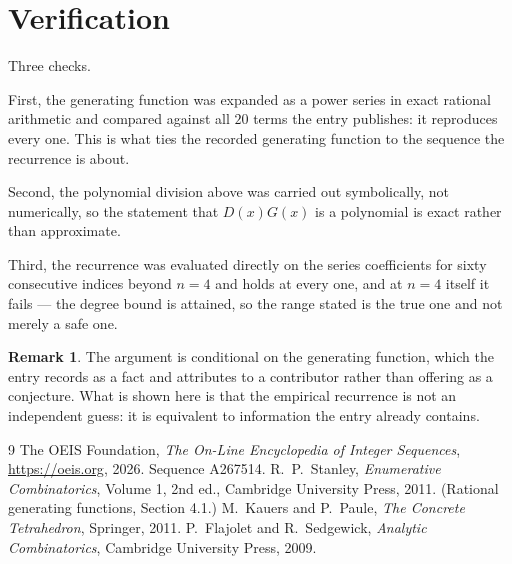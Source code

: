 \documentclass[11pt,a4paper]{article}
\theoremstyle{plain}
\theoremstyle{definition}
\newtheorem{remark}[theorem]{Remark}
\begin{document}
\section{Verification}

Three checks.

First, the generating function was expanded as a power series in exact rational arithmetic and
compared against all $20$ terms the entry publishes: it reproduces every one. This is
what ties the recorded generating function to the sequence the recurrence is about.

Second, the polynomial division above was carried out symbolically, not numerically, so the
statement that $D(x)G(x)$ is a polynomial is exact rather than approximate.

Third, the recurrence was evaluated directly on the series coefficients for sixty consecutive
indices beyond $n=4$ and holds at every one, and at $n=4$ itself it fails --- the
degree bound is attained, so the range stated is the true one and not merely a safe one.

\begin{remark}
The argument is conditional on the generating function, which the entry records as a fact and
attributes to a contributor rather than offering as a conjecture. What is shown here is that
the empirical recurrence is not an independent guess: it is equivalent to information the
entry already contains.
\end{remark}

\begin{thebibliography}{9}
 The OEIS Foundation, \emph{The On-Line Encyclopedia of Integer
Sequences}, \url{https://oeis.org}, 2026. Sequence A267514.
 R.~P.~Stanley, \emph{Enumerative Combinatorics}, Volume 1, 2nd ed.,
Cambridge University Press, 2011. (Rational generating functions, Section 4.1.)
 M.~Kauers and P.~Paule, \emph{The Concrete Tetrahedron}, Springer, 2011.
 P.~Flajolet and R.~Sedgewick, \emph{Analytic Combinatorics}, Cambridge
University Press, 2009.
\end{thebibliography}
\end{document}
